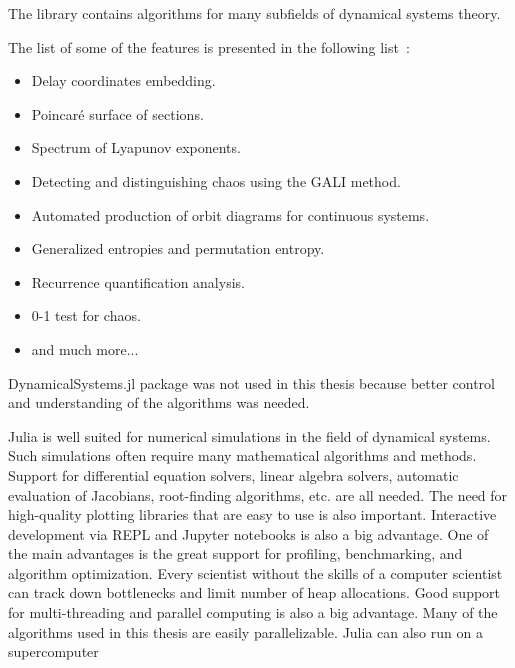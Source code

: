 The library contains algorithms for many subfields of dynamical systems theory.~\cite{Datseris2018}
\par
The list of some of the features is presented in the following list~\cite{DynamicalSystems2024}:
\begin{itemize}
    \item Delay coordinates embedding.
    \item Poincaré surface of sections.
    \item Spectrum of Lyapunov exponents.
    \item Detecting and distinguishing chaos using the GALI method.
    \item Automated production of orbit diagrams for continuous systems.
    \item Generalized entropies and permutation entropy.
    \item Recurrence quantification analysis.
    \item 0-1 test for chaos.
    \item and much more...
\end{itemize}

DynamicalSystems.jl package was not used in this thesis because better control and understanding of the algorithms was needed.
\par
Julia is well suited for numerical simulations in the field of dynamical systems.
Such simulations often require many mathematical algorithms and methods.
Support for differential equation solvers, linear algebra solvers, automatic evaluation of Jacobians, root-finding algorithms, etc. are all needed.
The need for high-quality plotting libraries that are easy to use is also important.
Interactive development via REPL and Jupyter notebooks is also a big advantage.
One of the main advantages is the great support for profiling, benchmarking, and algorithm optimization.
Every scientist without the skills of a computer scientist can track down bottlenecks and limit number of heap allocations.
Good support for multi-threading and parallel computing is also a big advantage.
Many of the algorithms used in this thesis are easily parallelizable.
Julia can also run on a supercomputer~\cite{Regier2016-vq}

